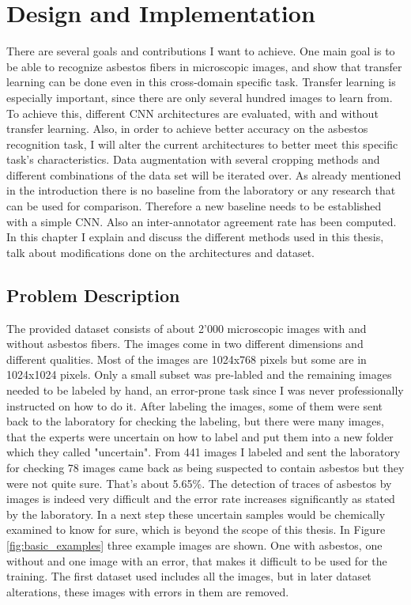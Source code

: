 \chapter{Design and Implementation}


There are several goals and contributions I want to achieve. One main goal is to be able to recognize asbestos fibers in microscopic images, and show that transfer learning can be done even in this cross-domain specific task. Transfer learning is especially important, since there are only several hundred images to learn from. To achieve this, different CNN architectures are evaluated, with and without transfer learning. Also, in order to achieve better accuracy on the asbestos recognition task, I will alter the current architectures to better meet this specific task's characteristics. Data augmentation with several cropping methods and different combinations of the data set will be iterated over. As already mentioned in the introduction there is no baseline from the laboratory or any research that can be used for comparison. Therefore a new baseline needs to be established with a simple CNN. Also an inter-annotator agreement rate has been computed. In this chapter I explain and discuss the different methods used in this thesis, talk about modifications done on the architectures and dataset.

\section{Problem Description}

The provided dataset consists of about 2'000 microscopic images with and without asbestos fibers. The images come in two different dimensions and different qualities. Most of the images are 1024x768 pixels but some are in 1024x1024 pixels. Only a small subset was pre-labled and the remaining images needed to be labeled by hand, an error-prone task since I was never professionally instructed on how to do it. After labeling the images, some of them were sent back to the laboratory for checking the labeling, but there were many images, that the experts were uncertain on how to label and put them into a new folder which they called  "uncertain". From 441 images I labeled and sent the laboratory for checking 78 images came back as being suspected to contain asbestos but they were not quite sure. That's about 5.65\%. The detection of traces of asbestos by images is indeed very difficult and the error rate increases significantly as stated by the laboratory. In a next step these uncertain samples would be chemically examined to know for sure, which is beyond the scope of this thesis. In Figure \ref{fig:basic_examples} three example images are shown. One with asbestos, one without and one image with an error, that makes it difficult to be used for the training. The first dataset used includes all the images, but in later dataset alterations, these images with errors in them are removed.

